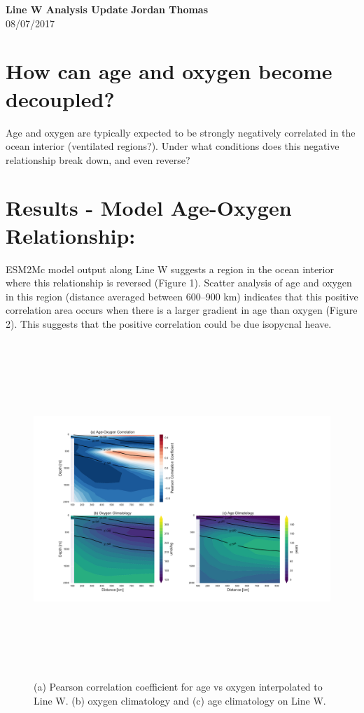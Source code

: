 \documentclass[11pt]{article}
\begin{document}
\noindent
\large\textbf{Line W Analysis Update} \hfill \textbf{Jordan Thomas} \\
08/07/2017 \\

\section*{How can age and oxygen become decoupled?}

Age and oxygen are typically expected to be strongly negatively correlated in the
ocean interior (ventilated regions?). Under what conditions does this negative
relationship break down, and even reverse?


\section*{Results - Model Age-Oxygen Relationship:}
ESM2Mc model output along Line W suggests a region in the ocean interior where
this relationship is reversed (Figure 1). Scatter analysis of age and oxygen
in this region (distance averaged between 600--900 km) indicates that this positive correlation
area occurs when there is a larger gradient in age than oxygen (Figure 2). This
suggests that the positive correlation could be due isopycnal heave.

\begin{figure}[b!]
    \centering
    \includegraphics[height=5in]{correlation_clim_on_linew.pdf}
    \caption{(a) Pearson correlation coefficient for age vs oxygen interpolated to
    Line W. (b) oxygen climatology and (c) age climatology on Line W.}
\end{figure}
\end{document}

